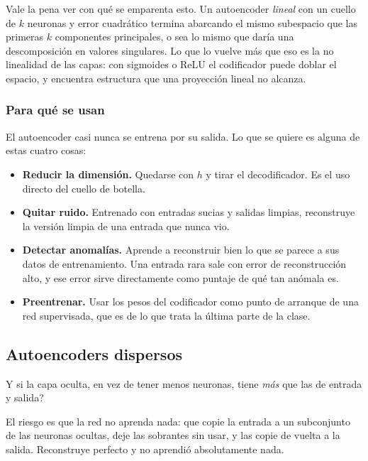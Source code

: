 \documentclass[11pt,letterpaper]{article}
\begin{document}
\begin{idea}
  Vale la pena ver con qué se emparenta esto. Un autoencoder
  \emph{lineal} con un cuello de $k$ neuronas y error cuadrático
  termina abarcando el mismo subespacio que las primeras $k$
  componentes principales, o sea lo mismo que daría una
  descomposición en valores singulares. Lo que lo vuelve más que eso
  es la no linealidad de las capas: con sigmoides o ReLU el codificador
  puede doblar el espacio, y encuentra estructura que una proyección
  lineal no alcanza.
\end{idea}

\subsubsection*{Para qué se usan}

El autoencoder casi nunca se entrena por su salida. Lo que se quiere
es alguna de estas cuatro cosas:

\begin{itemize}[itemsep=0.3em]
  \item \textbf{Reducir la dimensión.} Quedarse con $h$ y tirar el
        decodificador. Es el uso directo del cuello de botella.
  \item \textbf{Quitar ruido.} Entrenado con entradas sucias y
        salidas limpias, reconstruye la versión limpia de una entrada
        que nunca vio.
  \item \textbf{Detectar anomalías.} Aprende a reconstruir bien lo
        que se parece a sus datos de entrenamiento. Una entrada rara
        sale con error de reconstrucción alto, y ese error sirve
        directamente como puntaje de qué tan anómala es.
  \item \textbf{Preentrenar.} Usar los pesos del codificador como
        punto de arranque de una red supervisada, que es de lo que
        trata la última parte de la clase.
\end{itemize}

\subsection*{Autoencoders dispersos}

Y si la capa oculta, en vez de tener menos neuronas, tiene
\emph{más} que las de entrada y salida?

El riesgo es que la red no aprenda nada: que copie la entrada a un
subconjunto de las neuronas ocultas, deje las sobrantes sin usar, y
las copie de vuelta a la salida. Reconstruye perfecto y no aprendió
absolutamente nada.
\end{document}
